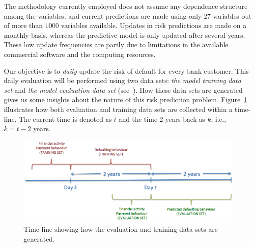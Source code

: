 The methodology currently employed does not assume any dependence structure among the variables, and current predictions are made using only $27$ variables out of more than $1000$ variables available. Updates in risk predictions are made on a monthly basis, whereas the predictive model is only updated after several years. These low update frequencies are partly due to limitations in the available commercial software and the computing resources.

Our objective is to \textit{daily} update the risk of default for every bank customer. This daily evaluation will be performed using two data sets: \textit{the model training data set} and \textit{the model evaluation data set} (see~\cite{Fer14b}). How these data sets are generated gives us some insights about the nature of this risk prediction problem. Figure~\ref{Figure:CajaMarTimeLine} illustrates how both evaluation and training data sets are collected within a time-line. The current time is denoted as $t$ and the time $2$ years back as $k$, i.e., $k=t-2$ years. 

\begin{figure}[htbp]
\centering
\includegraphics[scale=0.4]{figures/CajaMarTimeLine}
\caption{\label{Figure:CajaMarTimeLine}Time-line showing how the evaluation and training data sets are generated.}
\end{figure}

